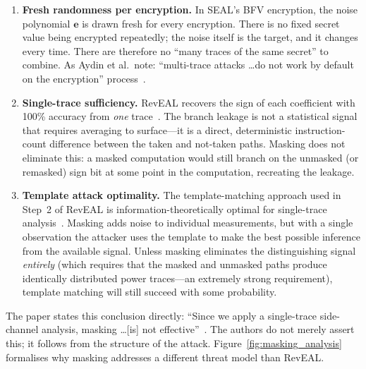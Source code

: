 \documentclass[sigconf,nonacm]{acmart}
\begin{document}
\begin{enumerate}
\sloppy
  \item \textbf{Fresh randomness per encryption.} In SEAL's BFV encryption, the
        noise polynomial $\mathbf{e}$ is drawn fresh for every encryption. There is
        no fixed secret value being encrypted repeatedly; the noise itself is
        the target, and it changes every time. There are therefore no ``many traces
        of the same secret'' to combine. As Aydin et al.\ note: ``multi-trace attacks
        \ldots do not work by default on the encryption'' process~\cite{aydin2022reveal}.

  \item \textbf{Single-trace sufficiency.} RevEAL recovers the sign of each coefficient
        with 100\% accuracy from \emph{one} trace~\cite{aydin2022reveal}. The branch
        leakage is not a statistical signal that requires averaging to surface---it
        is a direct, deterministic instruction-count difference between the taken and
        not-taken paths. Masking does not eliminate this: a masked computation would
        still branch on the unmasked (or remasked) sign bit at some point in the
        computation, recreating the leakage.

  \item \textbf{Template attack optimality.} The template-matching approach used in
        Step~2 of RevEAL is information-theoretically optimal for single-trace
        analysis~\cite{chari2002}. Masking adds noise to individual measurements,
        but with a single observation the attacker uses the template to make the best
        possible inference from the available signal. Unless masking eliminates the
        distinguishing signal \emph{entirely} (which requires that the masked and
        unmasked paths produce identically distributed power traces---an extremely
        strong requirement), template matching will still succeed with some
        probability.
\end{enumerate}

The paper states this conclusion directly: ``Since we apply a single-trace
side-channel analysis, masking \ldots [is] not effective''~\cite{aydin2022reveal}.
The authors do not merely assert this; it follows from the structure of the
attack. Figure~\ref{fig:masking_analysis} formalises why masking addresses a
different threat model than RevEAL.
\end{document}
